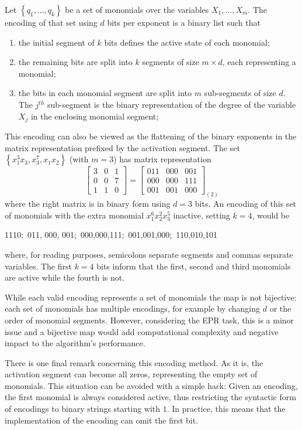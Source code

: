 \documentclass[times,review,preprint]{elsarticle}
\newcommand{\nth}{\ensuremath{^{th}}}
\begin{document}
Let  $\left\lbrace q_1, \ldots, q_k\right\rbrace$ be a set of monomials over the variables $X_1, \ldots, X_m$. The encoding of that set using $d$ bits per exponent is a binary list such that
\begin{enumerate}
\item the initial segment of $k$ bits defines the active state of each monomial;
\item the remaining bits are split into $k$ segments of size $m\times d$, each representing a monomial;
\item the bits in each monomial segment are split into $m$ sub-segments of size $d$. The $j\nth$ sub-segment is the binary representation of the degree of the variable $X_j$ in the enclosing monomial segment;
\end{enumerate}
This encoding can also be viewed as the flattening of the binary exponents in the matrix representation prefixed by the activation segment. The set $\left\lbrace x_1^3 x_3, x_3^7, x_1 x_2\right\rbrace$ (with $m = 3$) has matrix representation
$$\left[ 
\begin{array}{ccc}
3 & 0 & 1 \\
0 & 0 & 7 \\
1 & 1 & 0
\end{array}
\right] = \left[ 
\begin{array}{ccc}
011 & 000 & 001 \\
000 & 000 & 111 \\
001 & 001 & 000
\end{array}
\right]_{\left( 2 \right)}
$$
where the right matrix is in binary form using $d = 3$ bits. An encoding of this set of monomials with the extra monomial $x_1^6x_2^2x_3^5$ inactive, setting $k = 4$, would be
\begin{center}
1110;~011, 000, 001;~000,000,111;~001,001,000;~110,010,101
\end{center}
where, for reading purposes, semicolons separate segments and commas separate variables. The first $k=4$ bits inform that the first, second and third monomials are active while the fourth is not.

While each valid encoding represents a set of monomials the map is not bijective: each set of monomials has multiple encodings, for example by changing $d$ or the order of monomial segments. However, considering the \ac{EPR} task, this is a minor issue and a bijective map would add computational complexity and negative impact to the algorithm's performance.

There is one final remark concerning this encoding method. As it is, the activation segment can become all zeros, representing the empty set of monomials. This situation can be avoided with a simple hack: Given an encoding, the first monomial is always considered active, thus restricting the syntactic form of encodings to binary strings starting with $1$. In practice, this means that the implementation of the encoding can omit the first bit.
\end{document}
